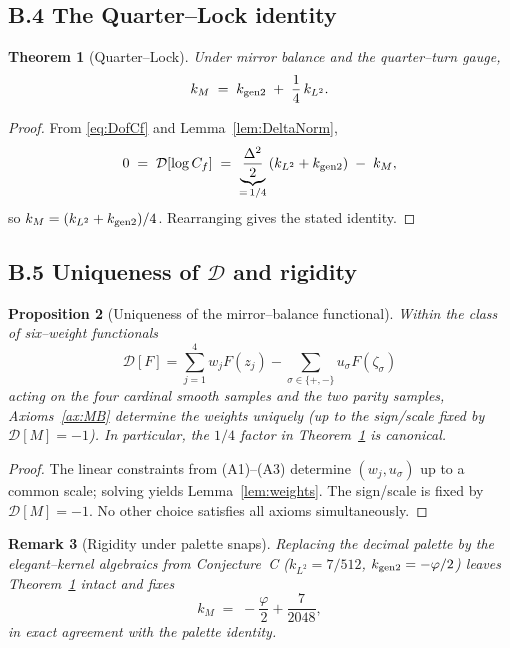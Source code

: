 \documentclass[12pt]{article}
\newtheorem{theorem}{Theorem}[section]
\newtheorem{proposition}[theorem]{Proposition}
\newtheorem{remark}[theorem]{Remark}
\numberwithin{equation}{section}
\begin{document}
\bigskip
\subsection*{B.4 \; The Quarter–Lock identity}

\begin{theorem}[Quarter–Lock]\label{thm:QL}
Under mirror balance and the quarter–turn gauge,
\[
k_M \;=\; k_{\rm gen2} \;+\; \frac{1}{4}\,k_{L^2}.
\]
\end{theorem}

\begin{proof}
From \eqref{eq:DofCf} and Lemma~\ref{lem:DeltaNorm},
\[
0\;=\;\mathcal{D}[\log C_f]\;=\;\underbrace{\frac{\Delta^2}{2}}_{=\,1/4}\,(k_{L^2}+k_{\rm gen2}) \;-\; k_M,
\]
so $k_M=(k_{L^2}+k_{\rm gen2})/4$. Rearranging gives the stated identity.
\end{proof}

\bigskip
\subsection*{B.5 \; Uniqueness of \texorpdfstring{$\mathcal{D}$}{D} and rigidity}

\begin{proposition}[Uniqueness of the mirror–balance functional]\label{prop:uniqD}
Within the class of six–weight functionals
\[
\mathcal{D}[F]=\sum_{j=1}^4 w_j F(z_j) - \sum_{\sigma\in\{+,-\}} u_\sigma F(\zeta_\sigma)
\]
acting on the four cardinal smooth samples and the two parity samples, Axioms~\ref{ax:MB} determine the weights uniquely (up to the sign/scale fixed by $\mathcal{D}[M]=-1$). In particular, the $1/4$ factor in Theorem~\ref{thm:QL} is canonical.
\end{proposition}

\begin{proof}
The linear constraints from (A1)–(A3) determine $(w_j,u_\sigma)$ up to a common scale; solving yields Lemma~\ref{lem:weights}. The sign/scale is fixed by $\mathcal{D}[M]=-1$. No other choice satisfies all axioms simultaneously.
\end{proof}

\begin{remark}[Rigidity under palette snaps]
Replacing the decimal palette by the elegant–kernel algebraics from Conjecture~C ($k_{L^2}=7/512$, $k_{\rm gen2}=-\varphi/2$) leaves Theorem~\ref{thm:QL} intact and fixes
\[
k_M\;=\;-\frac{\varphi}{2}+\frac{7}{2048},
\]
in exact agreement with the palette identity.
\end{remark}
\end{document}
